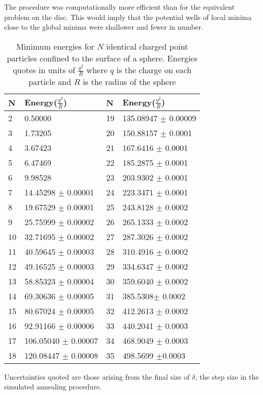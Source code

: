 \documentclass[12pt,a4paper,final]{iopart}
\begin{document}
{The procedure was computationally more efficient than for the equivalent  problem on the disc. This would imply that the potential wells of local minima close to the  global minima were shallower and fewer in number.

\begin{table}[htbp] 
  \centering
  \begin{threeparttable}
  \caption{Minimum energies for $N$ identical charged point particles confined to the surface of a sphere. Energies quotes in units of $\frac{q^2}{R}$ where $q$ is the charge on each particle and $R$ is the radius of the sphere}
    \begin{tabular}{llll}
    \toprule
    
\textbf{N} & \textbf{Energy($\frac{q^2}{R}$)}  & \textbf{N} & \textbf{Energy($\frac{q^2}{R}$)}  \\
    \midrule
    2     & 0.50000  & 19    & 135.08947 $\pm$ 0.00009 \\
    3     & 1.73205  & 20    & 150.88157 $\pm$ 0.0001 \\
    4     & 3.67423  & 21    & 167.6416 $\pm$ 0.0001 \\
    5     & 6.47469  & 22    & 185.2875 $\pm$  0.0001 \\
    6     & 9.98528  & 23    & 203.9302 $\pm$ 0.0001 \\
    7     & 14.45298 $\pm$ 0.00001 & 24    & 223.3471 $\pm$  0.0001 \\
    8     & 19.67529 $\pm$ 0.00001 & 25    & 243.8128 $\pm$  0.0002 \\
    9     & 25.75999 $\pm$ 0.00002 & 26    & 265.1333 $\pm$ 0.0002 \\
    10    & 32.71695 $\pm$ 0.00002 & 27    & 287.3026 $\pm$ 0.0002 \\
    11    & 40.59645 $\pm$ 0.00003 & 28    & 310.4916 $\pm$ 0.0002 \\
    12    & 49.16525 $\pm$ 0.00003 & 29    & 334.6347 $\pm$ 0.0002 \\
    13    & 58.85323 $\pm$ 0.00004 & 30    & 359.6040 $\pm$ 0.0002 \\
    14    & 69.30636 $\pm$  0.00005 & 31    & 385.5308$\pm$  0.0002 \\
    15    & 80.67024 $\pm$ 0.00005 & 32    & 412.2613 $\pm$ 0.0002 \\
    16    & 92.91166 $\pm$ 0.00006 & 33    & 440.2041 $\pm$ 0.0003 \\
    17    & 106.05040 $\pm$ 0.00007 & 34    & 468.9049 $\pm$ 0.0003 \\
    18    & 120.08447 $\pm$ 0.00008 & 35    & 498.5699 $\pm$0.0003 \\
    \bottomrule
    \end{tabular}%
    \begin{tablenotes}
      \small
      \item Uncertainties quoted are those arising from the final size of $\delta$, the step size in the simulated annealing procedure.
    \end{tablenotes}
  \label{tab:2}%
 \end{threeparttable}
\end{table}%

}
\end{document}

